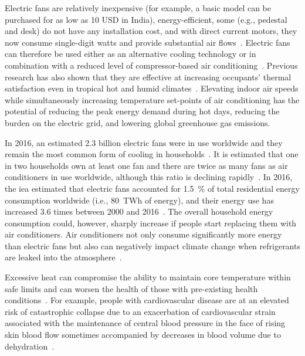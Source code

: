 Electric fans are relatively inexpensive (for example, a basic model can be purchased for as low as 10 USD in India), energy-efficient, some (e.g., pedestal and desk) do not have any installation cost, and with direct current motors, they now consume single-digit watts and provide substantial air flows~\cite{Yang2015a}.
Electric fans can therefore be used either as an alternative cooling technology or in combination with a reduced level of compressor-based air conditioning~\cite{Jay2019a, Hoyt2015, Schiavon2008}.
Previous research has also shown that they are effective at increasing occupants' thermal satisfaction even in tropical hot and humid climates~\cite{Lipczynska2018a}.
Elevating indoor air speeds while simultaneously increasing temperature set-points of air conditioning has the potential of reducing the peak energy demand during hot days, reducing the burden on the electric grid, and lowering global greenhouse gas emissions.

In 2016, an estimated 2.3 billion electric fans were in use worldwide and they remain the most common form of cooling in households~\cite{IEA2018}.
It is estimated that one in two households own at least one fan and there are twice as many fans as air conditioners in use worldwide, although this ratio is declining rapidly~\cite{IEA2018}.
In 2016, the \ac{iea} estimated that electric fans accounted for 1.5~\% of total residential energy consumption worldwide (i.e., 80~TWh of energy), and their energy use has increased 3.6 times between 2000 and 2016~\cite{IEA2018}.
The overall household energy consumption could, however, sharply increase if people start replacing them with air conditioners.
Air conditioners not only consume significantly more energy than electric fans but also can negatively impact climate change when refrigerants are leaked into the atmosphere~\cite{IEA2018}.

Excessive heat can compromise the ability to maintain core temperature within safe limits and can worsen the health of those with pre-existing health conditions~\cite{WMO2015}.
For example, people with cardiovascular disease are at an elevated risk of catastrophic collapse due to an exacerbation of cardiovascular strain associated with the maintenance of central blood pressure in the face of rising skin blood flow sometimes accompanied by decreases in blood volume due to dehydration~\cite{LancetJay}.

